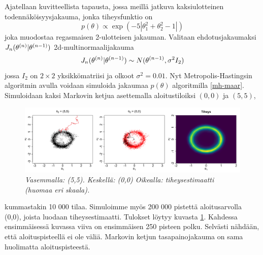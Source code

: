 \begin{esim}\label{mh-esim1}
	Ajatellaan kuvitteellista tapausta, jossa meillä jatkuva kaksiulotteinen todennäköisyysjakauma, jonka tiheysfunktio on 
	\begin{equation}
		p(\theta) \varpropto \exp(-5 |\theta_1^2+\theta_2^2-1|)
	\end{equation}
	joka muodostaa regasmaisen 2-ulotteisen jakauman. Valitaan ehdotusjakaumaksi $J_n(\theta^{(n)}|\theta^{(n-1)})$ 2d-multinormaalijakauma 
	\begin{equation}
		J_n(\theta^{(n)}|\theta^{(n-1)}) \sim N(\theta^{(n-1)}, \sigma^2 I_2)
	\end{equation}
	jossa $I_2$ on $2 \times 2$ yksikkömatriisi ja olkoot $\sigma^2 = 0.01$. Nyt Metropolis-Hastingsin algoritmin avulla voidaan simuloida jakaumaa $p(\theta)$ algoritmilla \ref{mh-maar}. Simuloidaan kaksi Markovin ketjua asettemalla aloitustiloiksi $(0,0)$ ja $(5,5)$, 
	\begin{figure}[h!]
		\includegraphics[width=\textwidth]{mhexample1}
		\caption[Kaksiulotteinen Metropolis--Hastings esimerkki]{\textit{Vasemmalla: (5,5). Keskellä: (0,0) Oikealla: tiheysestimaatti (huomaa eri skaala).}}
		\label{kuva1}
	\end{figure}
	kummastakin 10 000 tilaa. Simuloimme myös 200 000 pistettä aloitusarvolla (0,0), joista luodaan tiheysestimaatti. Tulokset löytyy kuvasta \ref{kuva1}. Kahdessa ensimmäisessä kuvassa viiva on ensimmäisen 250 pisteen polku. Selvästi nähdään, että aloituspisteellä ei ole väliä. Markovin ketjun tasapainojakauma on sama huolimatta aloituspisteestä.
	
\end{esim}

